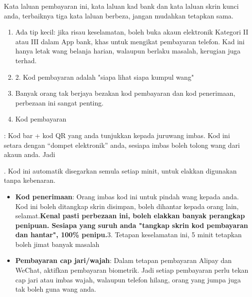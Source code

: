 


Kata laluan pembayaran ini, kata laluan kad bank dan kata laluan skrin kunci anda, terbaiknya tiga kata laluan berbeza, jangan mudahkan tetapkan sama.

\begin{enumerate}
  \item Ada tip kecil: jika risau keselamatan, boleh buka akaun elektronik Kategori II atau III dalam App bank, khas untuk mengikat pembayaran telefon. Kad ini hanya letak wang belanja harian, walaupun berlaku masalah, kerugian juga terhad.
  \item 2. Kod pembayaran adalah "siapa lihat siapa kumpul wang"
  \item Banyak orang tak berjaya bezakan kod pembayaran dan kod penerimaan, perbezaan ini sangat penting.
  \item Kod pembayaran
\end{enumerate}

: Kod bar + kod QR yang anda tunjukkan kepada juruwang imbas. Kod ini setara dengan “dompet elektronik” anda, sesiapa imbas boleh tolong wang dari akaun anda. Jadi


. Kod ini automatik disegarkan semula setiap minit, untuk elakkan digunakan tanpa kebenaran.

\begin{itemize}
  \item \textbf{Kod penerimaan}: Orang imbas kod ini untuk pindah wang kepada anda. Kod ini boleh ditangkap skrin disimpan, boleh dihantar kepada orang lain, selamat.\textbf{Kenal pasti perbezaan ini, boleh elakkan banyak perangkap penipuan. Sesiapa yang suruh anda "tangkap skrin kod pembayaran dan hantar", 100\% penipu.}3. Tetapan keselamatan ini, 5 minit tetapkan boleh jimat banyak masalah
  \item \textbf{Pembayaran cap jari/wajah}: Dalam tetapan pembayaran Alipay dan WeChat, aktifkan pembayaran biometrik. Jadi setiap pembayaran perlu tekan cap jari atau imbas wajah, walaupun telefon hilang, orang yang jumpa juga tak boleh guna wang anda.
\end{itemize}

